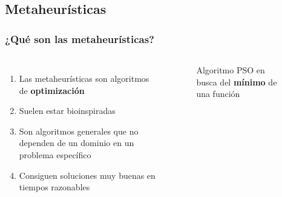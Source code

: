 \subsection{Metaheurísticas}
\begin{frame}
  \frametitle{¿Qué son las metaheurísticas?}
  \begin{columns}
    \begin{enumerate}
      \item Las metaheurísticas son algoritmos de \textbf{optimización}
      \item Suelen estar bioinspiradas
      \item Son algoritmos generales que no dependen de un dominio en un problema específico
      \item Consiguen soluciones muy buenas en tiempos razonables
    \end{enumerate}
    \begin{figure}
      \begin{center}
      \end{center}
      \caption{Algoritmo PSO en busca del \textbf{mínimo} de una función\footnotemark[2]}
    \end{figure}
  \end{columns}
\end{frame}

\note{

}


